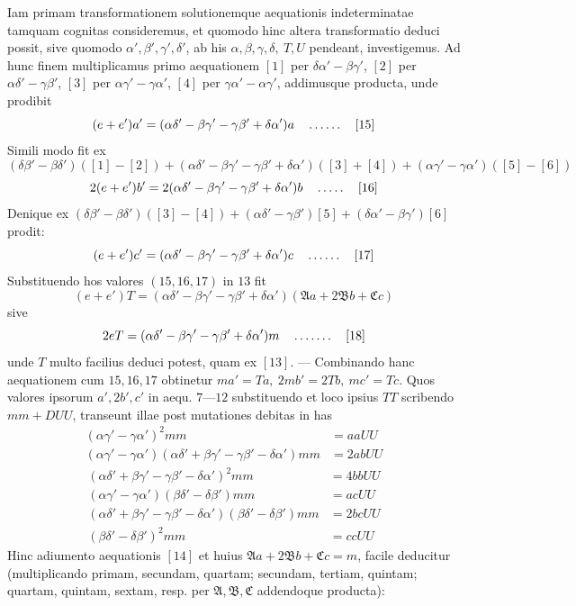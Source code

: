 Iam primam transformationem solutionemque aequationis indeterminatae tamquam cognitas consideremus, et quomodo hinc altera transformatio deduci possit, sive quomodo \(\alpha',\beta',\gamma',\delta'\), ab his \(\alpha,\beta,\gamma,\delta,\ T,U\) pendeant, investigemus. Ad hunc finem multiplicamus primo aequationem \([1]\) per \(\delta\alpha'-\beta\gamma'\), \([2]\) per \(\alpha\delta'-\gamma\beta'\), \([3]\) per \(\alpha\gamma'-\gamma\alpha'\), \([4]\) per \(\gamma\alpha'-\alpha\gamma'\), addimusque producta, unde prodibit
\[
(e+e')a'=(\alpha\delta'-\beta\gamma'-\gamma\beta'+\delta\alpha')a\quad\mathinner{.\,.\,.\,.\,.\,.}\quad[15]
\]
Simili modo fit ex
\[
(\delta\beta'-\beta\delta')([1]-[2])+(\alpha\delta'-\beta\gamma'-\gamma\beta'+\delta\alpha')([3]+[4])+(\alpha\gamma'-\gamma\alpha')([5]-[6])
\]
\[
2(e+e')b'=2(\alpha\delta'-\beta\gamma'-\gamma\beta'+\delta\alpha')b\quad\mathinner{.\,.\,.\,.\,.}\quad[16]
\]
Denique ex \((\delta\beta'-\beta\delta')([3]-[4])+(\alpha\delta'-\gamma\beta')[5]+(\delta\alpha'-\beta\gamma')[6]\) prodit:
\[
(e+e')c'=(\alpha\delta'-\beta\gamma'-\gamma\beta'+\delta\alpha')c\quad\mathinner{.\,.\,.\,.\,.\,.}\quad[17]
\]
Substituendo hos valores \((15,16,17)\) in \(13\) fit
\[
(e+e')T=(\alpha\delta'-\beta\gamma'-\gamma\beta'+\delta\alpha')(\mathfrak{A}a+2\mathfrak{B}b+\mathfrak{C}c)
\]
sive
\[
2eT=(\alpha\delta'-\beta\gamma'-\gamma\beta'+\delta\alpha')m\quad\mathinner{.\,.\,.\,.\,.\,.\,.}\quad[18]
\]
unde \(T\) multo facilius deduci potest, quam ex \([13]\). --- Combinando hanc aequationem cum \(15,16,17\) obtinetur \(ma'=Ta,\ 2mb'=2Tb,\ mc'=Tc\). Quos valores ipsorum \(a',2b',c'\) in aequ. \(7\text{---}12\) substituendo et loco ipsius \(TT\) scribendo \(mm+DUU\), transeunt illae post mutationes debitas in has
\[
\begin{aligned}
(\alpha\gamma'-\gamma\alpha')^2mm&=aaUU\\
(\alpha\gamma'-\gamma\alpha')(\alpha\delta'+\beta\gamma'-\gamma\beta'-\delta\alpha')mm&=2abUU
\end{aligned}
\]
\[
\begin{aligned}
(\alpha\delta'+\beta\gamma'-\gamma\beta'-\delta\alpha')^2mm&=4bbUU\\
(\alpha\gamma'-\gamma\alpha')(\beta\delta'-\delta\beta')mm&=acUU\\
(\alpha\delta'+\beta\gamma'-\gamma\beta'-\delta\alpha')(\beta\delta'-\delta\beta')mm&=2bcUU\\
(\beta\delta'-\delta\beta')^2mm&=ccUU
\end{aligned}
\]
Hinc adiumento aequationis \([14]\) et huius \(\mathfrak{A}a+2\mathfrak{B}b+\mathfrak{C}c=m\), facile deducitur (multiplicando primam, secundam, quartam; secundam, tertiam, quintam; quartam, quintam, sextam, resp. per \(\mathfrak{A},\mathfrak{B},\mathfrak{C}\) addendoque producta):
